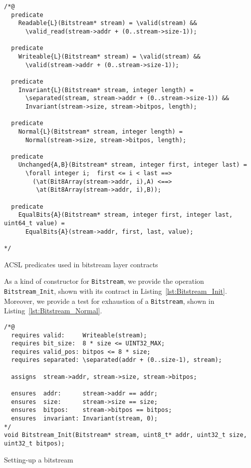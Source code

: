 \begin{listing}[hbt]
\begin{minipage}{0.99\textwidth}
\begin{lstlisting}[style=acsl-block]
/*@
  predicate 
    Readable{L}(Bitstream* stream) = \valid(stream) &&
      \valid_read(stream->addr + (0..stream->size-1));

  predicate
    Writeable{L}(Bitstream* stream) = \valid(stream) &&
      \valid(stream->addr + (0..stream->size-1));

  predicate
    Invariant{L}(Bitstream* stream, integer length) =
      \separated(stream, stream->addr + (0..stream->size-1)) &&
      Invariant(stream->size, stream->bitpos, length);

  predicate
    Normal{L}(Bitstream* stream, integer length) =
      Normal(stream->size, stream->bitpos, length);

  predicate
    Unchanged{A,B}(Bitstream* stream, integer first, integer last) =
      \forall integer i;  first <= i < last ==>
        (\at(Bit8Array(stream->addr, i),A) <==>
         \at(Bit8Array(stream->addr, i),B));

  predicate
    EqualBits{A}(Bitstream* stream, integer first, integer last, uint64_t value) =
      EqualBits{A}(stream->addr, first, last, value);

*/
\end{lstlisting}
\end{minipage}
\caption{\label{lst:Bitstream preds}
	ACSL predicates used in bitstream layer contracts}
\end{listing}




As a kind of constructor for
\lstinline{Bitstream}, we provide the operation \lstinline{Bitstream_Init},
shown with its contract in Listing~\ref{lst:Bitstream_Init}.
%
Moreover, we provide a test for exhaustion of a \lstinline{Bitstream},
shown in Listing~\ref{lst:Bitstream_Normal}.




\begin{listing}[hbt]
\begin{minipage}{0.99\textwidth}
\begin{lstlisting}[style=acsl-block]
/*@
  requires valid:     Writeable(stream);
  requires bit_size:  8 * size <= UINT32_MAX;
  requires valid_pos: bitpos <= 8 * size;
  requires separated: \separated(addr + (0..size-1), stream);

  assigns  stream->addr, stream->size, stream->bitpos;

  ensures  addr:      stream->addr == addr;
  ensures  size:      stream->size == size;
  ensures  bitpos:    stream->bitpos == bitpos;
  ensures  invariant: Invariant(stream, 0);
*/
void Bitstream_Init(Bitstream* stream, uint8_t* addr, uint32_t size, uint32_t bitpos);
\end{lstlisting}
\end{minipage}
\caption{\label{lst:Bitstream_Init}Setting-up a bitstream}
\end{listing}



